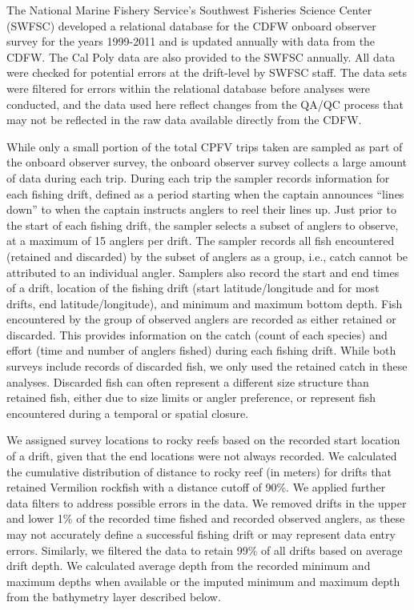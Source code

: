 \documentclass[
  12pt,
  authoryear,
  preprint,
  3p]{elsarticle}
\begin{document}
The National Marine Fishery Service's Southwest Fisheries Science Center
(SWFSC) developed a relational database for the CDFW onboard observer
survey \citeyearpar{Monk:2014:DRD} for the years 1999-2011 and is
updated annually with data from the CDFW. The Cal Poly data are also
provided to the SWFSC annually. All data were checked for potential
errors at the drift-level by SWFSC staff. The data sets were filtered
for errors within the relational database before analyses were
conducted, and the data used here reflect changes from the QA/QC process
that may not be reflected in the raw data available directly from the
CDFW.

While only a small portion of the total CPFV trips taken are sampled as
part of the onboard observer survey, the onboard observer survey
collects a large amount of data during each trip. During each trip the
sampler records information for each fishing drift, defined as a period
starting when the captain announces ``lines down'' to when the captain
instructs anglers to reel their lines up. Just prior to the start of
each fishing drift, the sampler selects a subset of anglers to observe,
at a maximum of 15 anglers per drift. The sampler records all fish
encountered (retained and discarded) by the subset of anglers as a
group, i.e., catch cannot be attributed to an individual angler.
Samplers also record the start and end times of a drift, location of the
fishing drift (start latitude/longitude and for most drifts, end
latitude/longitude), and minimum and maximum bottom depth. Fish
encountered by the group of observed anglers are recorded as either
retained or discarded. This provides information on the catch (count of
each species) and effort (time and number of anglers fished) during each
fishing drift. While both surveys include records of discarded fish, we
only used the retained catch in these analyses. Discarded fish can often
represent a different size structure than retained fish, either due to
size limits or angler preference, or represent fish encountered during a
temporal or spatial closure.

We assigned survey locations to rocky reefs based on the recorded start
location of a drift, given that the end locations were not always
recorded. We calculated the cumulative distribution of distance to rocky
reef (in meters) for drifts that retained Vermilion rockfish with a
distance cutoff of 90\%. We applied further data filters to address
possible errors in the data. We removed drifts in the upper and lower
1\% of the recorded time fished and recorded observed anglers, as these
may not accurately define a successful fishing drift or may represent
data entry errors. Similarly, we filtered the data to retain 99\% of all
drifts based on average drift depth. We calculated average depth from
the recorded minimum and maximum depths when available or the imputed
minimum and maximum depth from the bathymetry layer described below.
\end{document}
